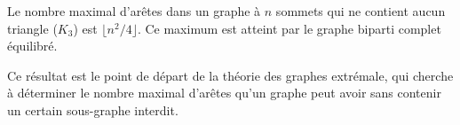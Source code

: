 \begin{theorem}
    Le nombre maximal d'arêtes dans un graphe à $n$ sommets qui ne contient aucun triangle ($K_3$) est $\lfloor n^2/4 \rfloor$. Ce maximum est atteint par le graphe biparti complet équilibré.
\end{theorem}
\begin{remark}
    Ce résultat est le point de départ de la théorie des graphes extrémale, qui cherche à déterminer le nombre maximal d'arêtes qu'un graphe peut avoir sans contenir un certain sous-graphe interdit.
\end{remark}